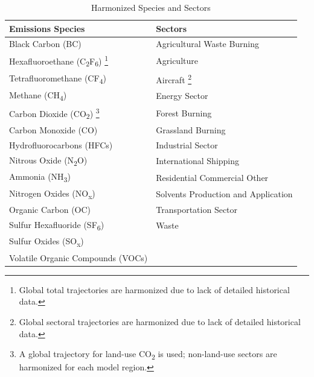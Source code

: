 \documentclass[review]{elsarticle}
\makeatletter
\newcommand{\nox}{NO\textsubscript{x}}
\newcommand{\nht}{NH\textsubscript{3}}
\newcommand\footnoteref[1]{\protected@xdef\@thefnmark{\ref{#1}}\@footnotemark}
\makeatother
\begin{document}
\begin{table}[]\begin{minipage}{\textwidth}
  \centering
  \caption{Harmonized Species and Sectors}
  \label{tab:sp}
  \begin{tabular}{|l|l|}
    \hline
    \textbf{Emissions Species}        & \textbf{Sectors}                    \\
    \hline
    \hline
    Black Carbon (BC)                 & Agricultural Waste Burning          \\
    Hexafluoroethane (C\textsubscript{2}F\textsubscript{6})
    \footnote{\label{x_glb_all}
      Global total trajectories are harmonized due to lack of detailed 
      historical data.}
                                      & Agriculture                         \\
    Tetrafluoromethane (CF\textsubscript{4})
    \footnoteref{x_glb_all}               & Aircraft
    \footnote{\label{x_glb}
      Global sectoral trajectories are harmonized due to lack of detailed 
      historical data.}                            \\
    Methane (CH\textsubscript{4})                     & Energy Sector                       \\
    Carbon Dioxide (CO\textsubscript{2})
    \footnote{\label{x_co2}
      A global trajectory for land-use CO\textsubscript{2} is used; non-land-use sectors 
      are harmonized for each model region.}
                                      & Forest Burning                      \\
    Carbon Monoxide (CO)              & Grassland Burning                   \\
    Hydrofluorocarbons (HFCs)
    \footnoteref{x_glb_all}               & Industrial Sector                   \\
    Nitrous Oxide (N\textsubscript{2}O)
    \footnoteref{x_glb_all}
                                      & International Shipping\footnoteref{x_glb}              \\
    Ammonia (\nht)                     & Residential Commercial Other        \\
    Nitrogen Oxides (\nox)             & Solvents Production and Application \\
    Organic Carbon (OC)               & Transportation Sector               \\
    Sulfur Hexafluoride (SF\textsubscript{6})
    \footnoteref{x_glb_all}               & Waste                               \\
    Sulfur Oxides (SO\textsubscript{x})               &                                     \\
    Volatile Organic Compounds (VOCs) &                                     \\
    \hline
  \end{tabular}
\end{minipage}\end{table}
\end{document}
